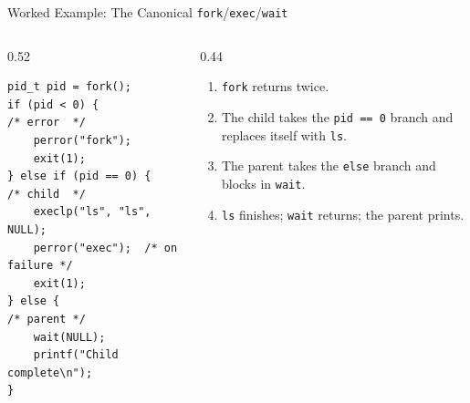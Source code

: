 \documentclass[aspectratio=169]{beamer}
\begin{document}
\begin{frame}[fragile]{Worked Example: The Canonical \texttt{fork}/\texttt{exec}/\texttt{wait}}
  \begin{columns}[T]
    \begin{column}{0.52\textwidth}
\footnotesize
\begin{verbatim}
pid_t pid = fork();
if (pid < 0) {            /* error  */
    perror("fork");
    exit(1);
} else if (pid == 0) {    /* child  */
    execlp("ls", "ls", NULL);
    perror("exec");  /* on failure */
    exit(1);
} else {                  /* parent */
    wait(NULL);
    printf("Child complete\n");
}
\end{verbatim}
    \end{column}
    \begin{column}{0.44\textwidth}
      \begin{enumerate}
        \small
        \item \texttt{fork} returns twice.
        \item The child takes the \texttt{pid == 0} branch and replaces itself
          with \texttt{ls}.
        \item The parent takes the \texttt{else} branch and blocks in
          \texttt{wait}.
        \item \texttt{ls} finishes; \texttt{wait} returns; the parent prints.
      \end{enumerate}
    \end{column}
  \end{columns}
  \vspace{0.1cm}
\end{frame}
\end{document}
